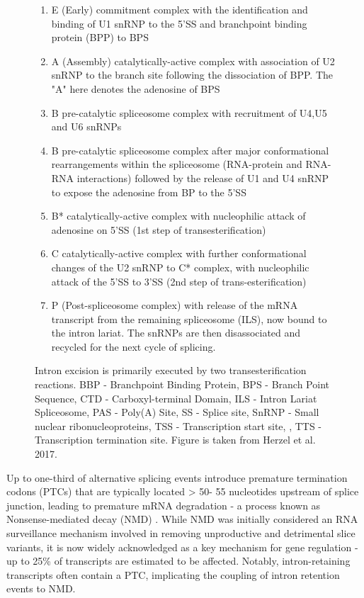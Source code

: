 \begin{figure}[!htp]
{\begin{enumerate}
			\item E (Early) commitment complex with the identification and binding of U1 snRNP to the 5'SS and branchpoint binding protein (BPP) to BPS 
			\item A (Assembly) catalytically-active complex with association of U2 snRNP to the branch site following the dissociation of BPP. The "A" here denotes the adenosine of BPS
			\item B pre-catalytic spliceosome complex with recruitment of U4,U5 and U6 snRNPs
			\item B pre-catalytic spliceosome complex after major conformational rearrangements within the spliceosome (RNA-protein and RNA-RNA interactions) followed by the release of U1 and U4 snRNP to expose the adenosine from BP to the 5'SS 
			\item B* catalytically-active complex with nucleophilic attack of adenosine on 5'SS (1st step of transesterification) 
			\item C catalytically-active complex with further conformational changes of the U2 snRNP to C* complex, with nucleophilic attack of the 5'SS to 3'SS (2nd step of trans-esterification) 
			\item P (Post-spliceosome complex) with release of the mRNA transcript from the remaining spliceosome (ILS), now bound to the intron lariat. The snRNPs are then disassociated and recycled for the next cycle of splicing.
			\\
		\end{enumerate} 
		Intron excision is primarily executed by two transesterification reactions. BBP - Branchpoint Binding Protein, BPS - Branch Point Sequence, CTD - Carboxyl-terminal Domain, ILS - Intron Lariat Spliceosome, PAS - Poly(A) Site, SS - Splice site, SnRNP - Small nuclear ribonucleoproteins, TSS - Transcription start site, , TTS - Transcription termination site. Figure is taken from Herzel et al. 2017\cite{Herzel2017}.
	}
	\label{fig:AS_mechanism}
\end{figure}

\newpage
{}
Up to one-third of alternative splicing events introduce premature termination codons (PTCs) that are typically located > 50- 55 nucleotides upstream of splice junction, leading to premature mRNA degradation - a process known as Nonsense-mediated decay (NMD)\cite{Lewis2003} . While NMD was initially considered an RNA surveillance mechanism involved in removing unproductive and detrimental slice variants, it is now widely acknowledged as a key mechanism for gene regulation\cite{Nickless2017} - up to 25\% of transcripts are estimated to be affected\cite{Weischenfeldt2012}. Notably, intron-retaining transcripts often contain a PTC, implicating the coupling of intron retention events to NMD\cite{Wong2013}.     

